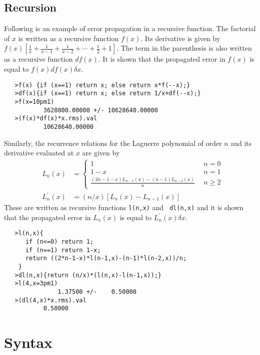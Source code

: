 \documentclass[11pt]{article}
\begin{document}
\subsection{Recursion}

Following is an example of error propagation in a recursive function.
The factorial of $x$ is written as a recursive function $f(x)$.  Its
derivative is given by 
$f(x)\left[\frac{1}{x} + \frac{1}{x-1} + \frac{1}{x-2} +\cdots +
\frac{1}{2} + 1\right]$.  The term in the parenthesis is also written
as a recursive function $df(x)$.  It is shown that the propagated
error in $f(x)$ is equal to $f(x)df(x)\delta x$.
\begin{verbatim}
   >f(x) {if (x==1) return x; else return x*f(--x);}
   >df(x){if (x==1) return x; else return 1/x+df(--x);}
   >f(x=10pm1)
           3628800.00000 +/- 10628640.00000
   >(f(x)*df(x)*x.rms).val
           10628640.00000
\end{verbatim}
Similarly, the recurrence relations for the Laguerre polynomial of
order $n$ and its derivative evaluated at $x$ are given by
\begin{eqnarray}
&L_n(x)& = \left\{
	\begin{array}{lr}
	1&~~n=0\\
	1-x&~~n=1\\
	\frac{\left(2n-1-x\right)L_{n-1}(x)-\left(n-1\right)L_{n-2}(x)}{n}&~~n\ge2
	\end{array}
	\right. \\
&L^\prime_n(x)&  = \left(n/x\right)\left[L_n(x) - L_{n-1}(x)\right]
\end{eqnarray}
These are written as recursive functions {\tt l(n,x)} and {\tt
dl(n,x)} and it is shown that the propagated error in $L_n(x)$ is
equal to $L^\prime_n(x)\delta x$.
\begin{verbatim}
   >l(n,x){
      if (n<=0) return 1;
      if (n==1) return 1-x;
      return ((2*n-1-x)*l(n-1,x)-(n-1)*l(n-2,x))/n;
    }
   >dl(n,x){return (n/x)*(l(n,x)-l(n-1,x));}
   >l(4,x=3pm1)
               1.37500 +/-    0.50000
   >(dl(4,x)*x.rms).val
           0.50000
\end{verbatim}

\section{Syntax}
\label{APPEN:SYNTAX}
\end{document}
